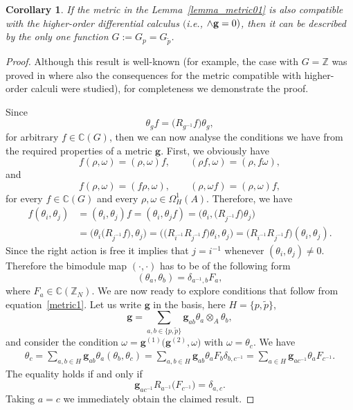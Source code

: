 \documentclass[pdftex]{sigma}
\numberwithin{equation}{section}
\newtheorem{Corollary}[Theorem]{Corollary}
\newcommand{\Z}{\mathbb{Z}}
\newcommand{\C}{\mathbb{C}}
\newcommand{\ip}{{\tilde{p}}}
\begin{document}
\begin{Corollary}\label{cor_metric}
If the metric in the Lemma~{\rm \ref{lemma_metric01}} is also compatible with the higher-order dif\-fe\-rential calculus $($i.e., $\wedge{\bf g}=0)$, then it can be described by the only one function $G:=G_p=G_\ip$.
\end{Corollary}

\begin{proof}Although this result is well-known (for example, the case with $G=\mathbb{Z}$ was proved in \cite{M2} where also the
consequences for the metric compatible with higher-order calculi were studied), for completeness we demonstrate the proof.

Since
\begin{equation*}
\theta_g f=\big(R_{g^{-1}} f\big) \theta_g,
\end{equation*}
for arbitrary $f \in \C(G)$, then we can now analyse the conditions we have from the required properties
of a metric $\mathbf{g}$. First, we obviously have
\[ f(\rho,\omega)=(\rho,\omega)f, \qquad (\rho f,\omega)=(\rho,f\omega),\]
and
\[ f(\rho,\omega)=(f\rho,\omega), \qquad (\rho,\omega f)=(\rho,\omega)f, \]
for every $f\in\C(G)$ and every $\rho,\omega\in \Omega^1_H(A)$. Therefore, we have
\begin{align*}
f(\theta_i,\theta_j)&=(\theta_i,\theta_j)f=(\theta_i,\theta_j f)=\big(\theta_i,\big(R_{j^{-1}}f\big)\theta_j\big) \\
&=\big(\theta_i\big(R_{j^{-1}}f\big),\theta_j\big)
=\big(\big(R_{i^{-1}}R_{j^{-1}}f\big) \theta_i,\theta_j\big) = \big(R_{i^{-1}}R_{j^{-1}}f\big)(\theta_i,\theta_j).
\end{align*}
Since the right action is free it implies that $j=i^{-1}$ whenever $(\theta_i,\theta_j)\neq0$. Therefore
the bimodule map $(\cdot, \cdot)$ has to be of the following form
\begin{equation*}
(\theta_a,\theta_b)=\delta_{a^{-1},b} F_{a},
\end{equation*}
where $F_a \in \C(\Z_N)$.
We are now ready to explore conditions that follow from equation~\eqref{metric1}. Let us write $\mathbf{g}$ in the basis, here $H=\{p,\ip\}$,
\begin{equation*}
\mathbf{g} = \sum\limits_{a,b \in \{p,\ip\}} \mathbf{g}_{ab} \theta_a \otimes_A \theta_b,
\end{equation*}
and consider the condition $\omega=\mathbf{g}^{(1)}\big(\mathbf{g}^{(2)},\omega\big)$ with
$\omega = \theta_c$. We have
\begin{gather*}
\theta_c
=\sum\limits_{a,b \in H} \mathbf{g}_{ab} \theta_a (\theta_b, \theta_c)=
\sum\limits_{a,b \in H} \mathbf{g}_{ab} \theta_a F_b \delta_{b,c^{-1}}
=\sum\limits_{a \in H} \mathbf{g}_{ac^{-1}} \theta_a F_{c^{-1}}.
\end{gather*}
The equality holds if and only if
\begin{equation*}
\mathbf{g}_{ac^{-1}} R_{a^{-1}}\big(F_{c^{-1}}\big) = \delta_{a,c}.
\end{equation*}
Taking $a=c$ we immediately obtain the claimed result.
\end{proof}
\end{document}
